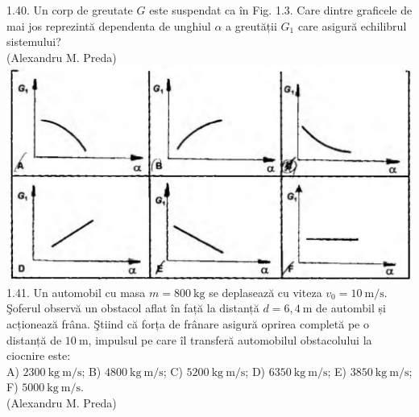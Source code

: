 \documentclass[10pt]{article}
\begin{document}
1.40. Un corp de greutate $G$ este suspendat ca în Fig. 1.3. Care dintre graficele de mai jos reprezintă dependenta de unghiul $\alpha$ a greutății $G_{1}$ care asigură echilibrul sistemului?\\ (Alexandru M. Preda)\\ \includegraphics[max width=\textwidth, center]{2025_07_01_5b3ff9fa0d508c8e9f17g-011(2)}\\

1.41. Un automobil cu masa $m=800 \mathrm{~kg}$ se deplasează cu viteza $v_{0}=10 \mathrm{~m} / \mathrm{s}$. Şoferul observă un obstacol aflat în față la distanță $d=6,4 \mathrm{~m}$ de autombil și acționează frâna. Ştiind că forța de frânare asigură oprirea completă pe o distanță de $10 \mathrm{~m}$, impulsul pe care îl transferă automobilul obstacolului la ciocnire este:\\ A) $2300 \mathrm{~kg} \mathrm{~m} / \mathrm{s}$; B) $4800 \mathrm{~kg} \mathrm{~m} / \mathrm{s}$; C) $5200 \mathrm{~kg} \mathrm{~m} / \mathrm{s}$; D) $6350 \mathrm{~kg} \mathrm{~m} / \mathrm{s}$; E) $3850 \mathrm{~kg} \mathrm{~m} / \mathrm{s}$; F) $5000 \mathrm{~kg} \mathrm{~m} / \mathrm{s}$.\\ (Alexandru M. Preda)\\
\end{document}
